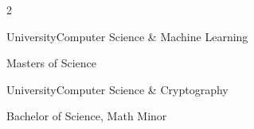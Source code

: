 \documentclass{article}
\newenvironment{*mylist}[2]{
  \subsection*{#1}
  \small
  \begin{list}{}{}
   \setlength{\topsep}{0pt}
   \setlength{\itemsep}{1pt}
   \setlength{\parskip}{0pt}
   \setlength{\parsep}{0pt}
 \item {\bf #2}
}{\end{list}\normalsize}
\newcommand{\LUx}[1]{{\bf\em #1}}
\begin{document}

\BSec{}
\vspace{.5em}

\begin{multicols}{2}

  \begin{*mylist}{ University}{Computer Science \& Machine Learning}
  \item Masters of Science %
\end{*mylist}\columnbreak

  \raggedright
  \begin{*mylist}{ University}{Computer Science \& Cryptography}
  \item Bachelor of Science, Math Minor %
  \end{*mylist}
\end{multicols}
\end{document}
